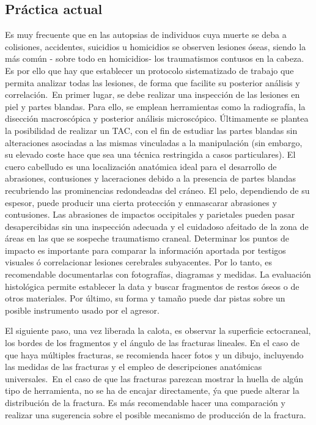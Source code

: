 \subsection{Práctica actual}\cite{Kranioti2015} \cite{Traumatic}
Es muy frecuente que en las autopsias de individuos cuya muerte se deba a colisiones, accidentes, suicidios u homicidios se observen lesiones óseas, siendo la más común - sobre todo en homicidios- los traumatismos contusos en la cabeza. Es por ello que hay que establecer un protocolo sistematizado de trabajo que permita analizar todas las lesiones, de forma que facilite su posterior análisis y correlación.\
En primer lugar, se debe realizar una inspección de las lesiones en piel y partes blandas. Para ello, se emplean herramientas como la radiografía, la disección macroscópica y posterior análisis microscópico. Últimamente se plantea la posibilidad de realizar un TAC, con el fin de estudiar las partes blandas sin alteraciones asociadas a las mismas vinculadas a la manipulación (sin embargo, su elevado coste hace que sea una técnica restringida a casos particulares). El cuero cabelludo es una localización anatómica ideal para el desarrollo de abrasiones, contusiones y laceraciones debido a la presencia de partes blandas recubriendo las prominencias redondeadas del cráneo. El pelo, dependiendo de su espesor, puede producir una cierta protección y enmascarar abrasiones y contusiones. Las abrasiones de impactos occipitales y parietales pueden pasar desapercibidas sin una inspección adecuada y el cuidadoso afeitado de la zona de áreas en las que se sospeche traumatismo craneal. Determinar los puntos de impacto es importante para comparar la información aportada por testigos visuales ó correlacionar lesiones cerebrales subyacentes. Por lo tanto, es recomendable documentarlas con fotografías, diagramas y medidas. La evaluación histológica permite establecer la data y buscar fragmentos de restos óseos o de otros materiales. Por último, su forma y tamaño puede dar pistas sobre un posible instrumento usado por el agresor.

El siguiente paso, una vez liberada la calota, es observar la superficie ectocraneal, los bordes de los fragmentos y el ángulo de las fracturas lineales. En el caso de que haya múltiples fracturas, se recomienda hacer fotos y un dibujo, incluyendo las medidas de las fracturas y el empleo de descripciones anatómicas universales.\ 
En el caso de que las fracturas parezcan mostrar la huella de algún tipo de herramienta, no se ha de encajar directamente, ýa que puede alterar la distribución de la fractura. Es más recomendable hacer una comparación y realizar una sugerencia sobre el posible mecanismo de producción de la fractura.

